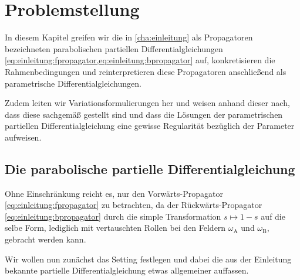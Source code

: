 
\chapter{Problemstellung} %
\label{cha:parametrische_problem_neuer_versuch}

In diesem Kapitel greifen wir die in \cref{cha:einleitung} als Propagatoren bezeichneten parabolischen partiellen Differentialgleichungen \cref{eq:einleitung:fpropagator,eq:einleitung:bpropagator} auf, konkretisieren die Rahmenbedingungen und reinterpretieren diese Propagatoren anschließend als parametrische Differentialgleichungen.

Zudem leiten wir Variationsformulierungen her und weisen anhand dieser nach, dass diese sachgemäß gestellt sind und dass die Lösungen der parametrischen partiellen Differentialgleichung eine gewisse Regularität bezüglich der Parameter aufweisen.


\section{Die parabolische partielle Differentialgleichung} %
\label{sec:die_parabolische_partielle_differentialgleichung}

Ohne Einschränkung reicht es, nur den Vorwärts-Propagator \cref{eq:einleitung:fpropagator} zu betrachten, da der Rückwärts-Propagator \cref{eq:einleitung:bpropagator} durch die simple Transformation $s \mapsto 1 - s$ auf die selbe Form, lediglich mit vertauschten Rollen bei den Feldern $\omega_{\mathrm{A}}$ und $\omega_{\mathrm{B}}$, gebracht werden kann.

Wir wollen nun zunächst das Setting festlegen und dabei die aus der Einleitung bekannte partielle Differentialgleichung etwas allgemeiner auffassen.

